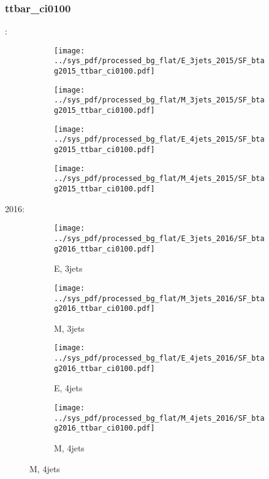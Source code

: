 \documentclass{beamer}
\begin{document}
\begin{frame}
\frametitle{ttbar_ci0100}
\fontsize{5}{1}:
\begin{figure}
\centering
\begin{subfigure}[b]{0.24\textwidth}
\texttt{[image: ../sys\_pdf/processed\_bg\_flat/E\_3jets\_2015/SF\_btag2015\_ttbar\_ci0100.pdf]}
\end{subfigure}
\begin{subfigure}[b]{0.24\textwidth}
\texttt{[image: ../sys\_pdf/processed\_bg\_flat/M\_3jets\_2015/SF\_btag2015\_ttbar\_ci0100.pdf]}
\end{subfigure}
\begin{subfigure}[b]{0.24\textwidth}
\texttt{[image: ../sys\_pdf/processed\_bg\_flat/E\_4jets\_2015/SF\_btag2015\_ttbar\_ci0100.pdf]}
\end{subfigure}
\begin{subfigure}[b]{0.24\textwidth}
\texttt{[image: ../sys\_pdf/processed\_bg\_flat/M\_4jets\_2015/SF\_btag2015\_ttbar\_ci0100.pdf]}
\end{subfigure}
\end{figure}
2016:
\begin{figure}
\centering
\begin{subfigure}[b]{0.24\textwidth}
\texttt{[image: ../sys\_pdf/processed\_bg\_flat/E\_3jets\_2016/SF\_btag2016\_ttbar\_ci0100.pdf]}
\captionsetup{font=tiny}
\caption{E, 3jets}
\end{subfigure}
\begin{subfigure}[b]{0.24\textwidth}
\texttt{[image: ../sys\_pdf/processed\_bg\_flat/M\_3jets\_2016/SF\_btag2016\_ttbar\_ci0100.pdf]}
\captionsetup{font=tiny}
\caption{M, 3jets}
\end{subfigure}
\begin{subfigure}[b]{0.24\textwidth}
\texttt{[image: ../sys\_pdf/processed\_bg\_flat/E\_4jets\_2016/SF\_btag2016\_ttbar\_ci0100.pdf]}
\captionsetup{font=tiny}
\caption{E, 4jets}
\end{subfigure}
\begin{subfigure}[b]{0.24\textwidth}
\texttt{[image: ../sys\_pdf/processed\_bg\_flat/M\_4jets\_2016/SF\_btag2016\_ttbar\_ci0100.pdf]}
\captionsetup{font=tiny}
\caption{M, 4jets}
\end{subfigure}
\end{figure}
\end{frame}
\end{document}

